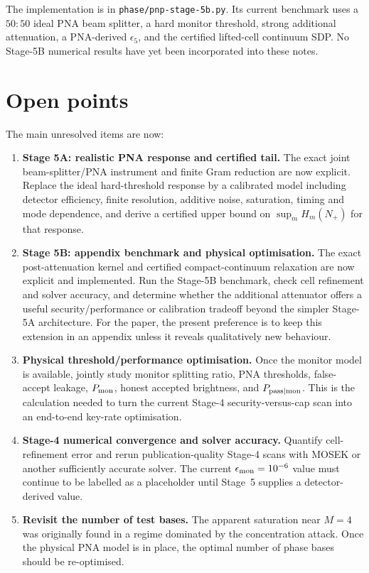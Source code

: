 \documentclass[11pt]{article}
\theoremstyle{remark}
\begin{document}
The implementation is in
\texttt{phase/pnp-stage-5b.py}.  Its current benchmark uses a \(50{:}50\)
ideal PNA beam splitter, a hard monitor threshold, strong additional
attenuation, a PNA-derived \(\epsilon_5\), and the certified lifted-cell
continuum SDP.  No Stage-5B numerical results have yet been incorporated into
these notes.

\section{Open points}

The main unresolved items are now:

\begin{enumerate}
    \item \textbf{Stage 5A: realistic PNA response and certified tail.}
    The exact joint beam-splitter/PNA instrument and finite Gram reduction are
    now explicit.  Replace the ideal hard-threshold response by a calibrated
    model including detector efficiency, finite resolution, additive noise,
    saturation, timing and mode dependence, and derive a certified upper bound
    on \(\sup_m H_m(N_+)\) for that response.

    \item \textbf{Stage 5B: appendix benchmark and physical optimisation.}
    The exact post-attenuation kernel and certified compact-continuum
    relaxation are now explicit and implemented.  Run the Stage-5B benchmark,
    check cell refinement and solver accuracy, and determine whether the
    additional attenuator offers a useful security/performance or calibration
    tradeoff beyond the simpler Stage-5A architecture.  For the paper, the
    present preference is to keep this extension in an appendix unless it
    reveals qualitatively new behaviour.

    \item \textbf{Physical threshold/performance optimisation.}
    Once the monitor model is available, jointly study monitor splitting
    ratio, PNA thresholds, false-accept leakage, \(P_{\rm mon}\), honest
    accepted brightness, and \(P_{\rm pass|mon}\).  This is the calculation
    needed to turn the current Stage-4 security-versus-cap scan into an
    end-to-end key-rate optimisation.

    \item \textbf{Stage-4 numerical convergence and solver accuracy.}
    Quantify cell-refinement error and rerun publication-quality Stage-4
    scans with MOSEK or another sufficiently accurate solver.  The current
    \(\epsilon_{\rm mon}=10^{-6}\) value must continue to be labelled as a
    placeholder until Stage~5 supplies a detector-derived value.

    \item \textbf{Revisit the number of test bases.}
    The apparent saturation near \(M=4\) was originally found in a regime
    dominated by the concentration attack.  Once the physical PNA model is in
    place, the optimal number of phase bases should be re-optimised.
\end{enumerate}
\end{document}
